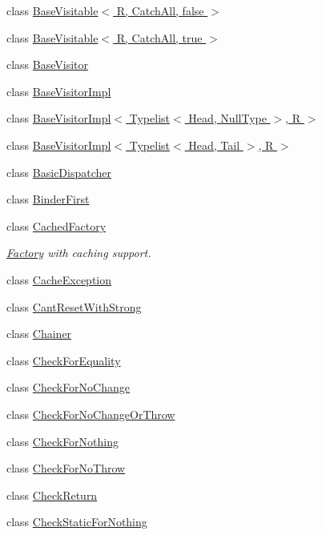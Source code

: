 \begin{DoxyCompactItemize}
class \hyperlink{classLoki_1_1BaseVisitable_3_01R_00_01CatchAll_00_01false_01_4}{Base\+Visitable$<$ R, Catch\+All, false $>$}
\item 
class \hyperlink{classLoki_1_1BaseVisitable_3_01R_00_01CatchAll_00_01true_01_4}{Base\+Visitable$<$ R, Catch\+All, true $>$}
\item 
class \hyperlink{classLoki_1_1BaseVisitor}{Base\+Visitor}
\item 
class \hyperlink{classLoki_1_1BaseVisitorImpl}{Base\+Visitor\+Impl}
\item 
class \hyperlink{classLoki_1_1BaseVisitorImpl_3_01Typelist_3_01Head_00_01NullType_01_4_00_01R_01_4}{Base\+Visitor\+Impl$<$ Typelist$<$ Head, Null\+Type $>$, R $>$}
\item 
class \hyperlink{classLoki_1_1BaseVisitorImpl_3_01Typelist_3_01Head_00_01Tail_01_4_00_01R_01_4}{Base\+Visitor\+Impl$<$ Typelist$<$ Head, Tail $>$, R $>$}
\item 
class \hyperlink{classLoki_1_1BasicDispatcher}{Basic\+Dispatcher}
\item 
class \hyperlink{classLoki_1_1BinderFirst}{Binder\+First}
\item 
class \hyperlink{classLoki_1_1CachedFactory}{Cached\+Factory}
\begin{DoxyCompactList}\small\item\em \hyperlink{classLoki_1_1Factory}{Factory} with caching support. \end{DoxyCompactList}\item 
class \hyperlink{classLoki_1_1CacheException}{Cache\+Exception}
\item 
class \hyperlink{structLoki_1_1CantResetWithStrong}{Cant\+Reset\+With\+Strong}
\item 
class \hyperlink{classLoki_1_1Chainer}{Chainer}
\item 
class \hyperlink{classLoki_1_1CheckForEquality}{Check\+For\+Equality}
\item 
class \hyperlink{classLoki_1_1CheckForNoChange}{Check\+For\+No\+Change}
\item 
class \hyperlink{classLoki_1_1CheckForNoChangeOrThrow}{Check\+For\+No\+Change\+Or\+Throw}
\item 
class \hyperlink{classLoki_1_1CheckForNothing}{Check\+For\+Nothing}
\item 
class \hyperlink{classLoki_1_1CheckForNoThrow}{Check\+For\+No\+Throw}
\item 
class \hyperlink{classLoki_1_1CheckReturn}{Check\+Return}
\item 
class \hyperlink{classLoki_1_1CheckStaticForNothing}{Check\+Static\+For\+Nothing}

\end{DoxyCompactItemize}
